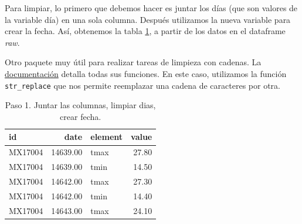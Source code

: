 \documentclass[]{article}
\newenvironment{Shaded}{\begin{snugshade}}{\end{snugshade}}
\newcommand{\KeywordTok}[1]{\textcolor[rgb]{0.13,0.29,0.53}{\textbf{#1}}}
\newcommand{\DataTypeTok}[1]{\textcolor[rgb]{0.13,0.29,0.53}{#1}}
\newcommand{\StringTok}[1]{\textcolor[rgb]{0.31,0.60,0.02}{#1}}
\newcommand{\CommentTok}[1]{\textcolor[rgb]{0.56,0.35,0.01}{\textit{#1}}}
\newcommand{\OperatorTok}[1]{\textcolor[rgb]{0.81,0.36,0.00}{\textbf{#1}}}
\newcommand{\NormalTok}[1]{#1}
\begin{document}
Para limpiar, lo primero que debemos hacer es juntar los días (que son
valores de la variable día) en una sola columna. Después utilizamos la
nueva variable para crear la fecha. Así, obtenemos la tabla
\ref{tab:clima1}, a partir de los datos en el dataframe \emph{raw}.

\begin{Shaded}
\end{Shaded}

\begin{nota}[stringr]
Otro paquete muy útil para realizar tareas de limpieza con cadenas. 
La \href{https://cran.r-project.org/web/packages/stringr/stringr.pdf}{documentación}
detalla todas sus funciones. En este caso, utilizamos la función \texttt{str\_replace}
que nos permite reemplazar una cadena de caracteres por otra.
\end{nota}

\begin{table}[ht]
\centering
\begin{tabular}{lrlr}
  \hline
id & date & element & value \\ 
  \hline
MX17004 & 14639.00 & tmax & 27.80 \\ 
  MX17004 & 14639.00 & tmin & 14.50 \\ 
  MX17004 & 14642.00 & tmax & 27.30 \\ 
  MX17004 & 14642.00 & tmin & 14.40 \\ 
  MX17004 & 14643.00 & tmax & 24.10 \\ 
   \hline
\end{tabular}
\caption{Paso 1. Juntar las columnas, limpiar dias, crear fecha.} 
\label{tab:clima1}
\end{table}
\end{document}
